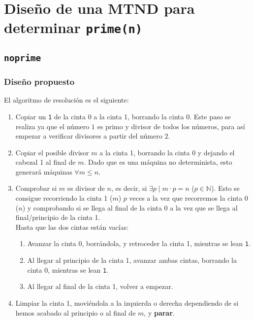 \section{Diseño de una MTND para determinar \texttt{prime(n)}}


\subsection{\texttt{noprime}} \label{MT-7A}

\subsubsection*{Diseño propuesto}
El algoritmo de resolución es el siguiente:

\begin{enumerate}
    \item Copiar un \texttt{1} de la cinta 0 a la cinta 1, borrando la cinta 0. Este paso se realiza ya que el número $1$ es primo y divisor de todos los números, para así empezar a verificar divisores a partir del número $2$.
    \item Copiar el posible divisor $m$ a la cinta 1, borrando la cinta 0 y dejando el cabezal 1 al final de $m$. Dado que es una máquina no determinista, esto generará máquinas $\forall m \leq n$.
    \item Comprobar si $m$ es divisor de $n$, es decir, si $\exists p \mid m\cdot p = n$ ($p \in \mathbb{N}$). Esto se consigue recorriendo la cinta 1 ($m$) $p$ veces a la vez que recorremos la cinta 0 ($n$) y comprobando si se llega al final de la cinta 0 a la vez que se llega al final/principio de la cinta 1.\\
    Hasta que las dos cintas están vacías:
    \begin{enumerate}[1.]
        \item Avanzar la cinta 0, borrándola, y retroceder la cinta 1, mientras se lean \texttt{1}.
        \item Al llegar al principio de la cinta 1, avanzar ambas cintas, borrando la cinta 0, mientras se lean \texttt{1}.
        \item Al llegar al final de la cinta 1, volver a empezar.
    \end{enumerate}
    \item Limpiar la cinta 1, moviéndola a la izquierda o derecha dependiendo de si hemos acabado al principio o al final de $m$, y \textbf{parar}.
\end{enumerate}

